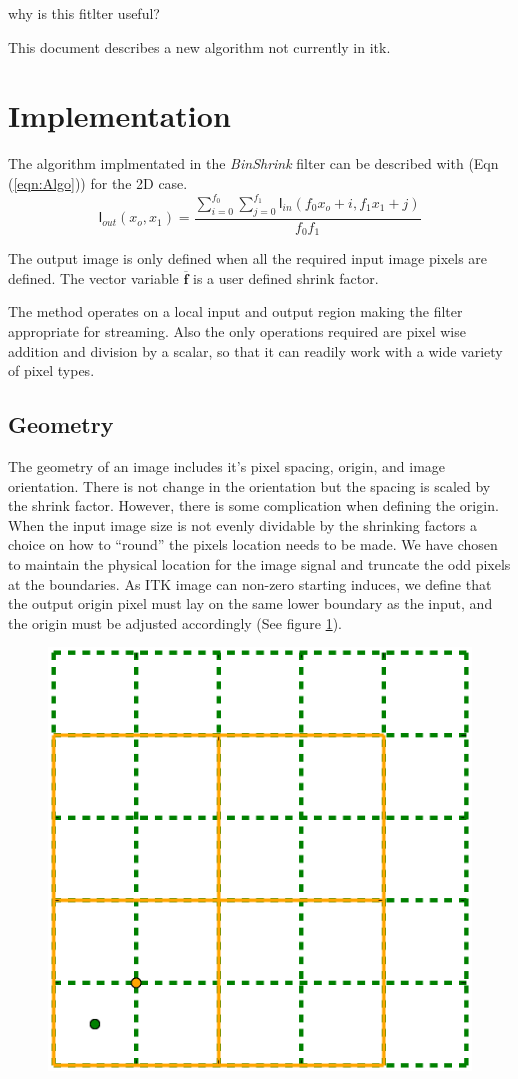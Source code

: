 \documentclass{InsightArticle}
\begin{document}
why is this fitlter useful?


This document describes a new algorithm not currently in
itk\cite{ITKSoftwareGuide}. 

\section{Implementation}

The algorithm implmentated in the \textit{BinShrink} filter can be
described with (Eqn (\ref{eqn:Algo})) for the 2D case. 
\begin{equation}
\label{eqn:Algo}
\mathsf{I}_{out}(x_o,x_1) = \frac{\sum_{i=0}^{f_0}\sum_{j=0}^{f_1}\mathsf{I}_{in}(f_0 x_o+i,f_1 x_1+j)}{f_0 f_1}
\end{equation}

The output image is only defined when all the required input image
pixels are defined. The vector variable $\mathbf{\overline{f}}$ is a user defined
shrink factor.

The method operates on a local input and output region making the
filter appropriate for streaming. Also the only operations required are
pixel wise addition and division by a scalar, so that it can readily
work with a wide variety of pixel types.

\subsection{Geometry}

The geometry of an image includes it's pixel spacing, origin, and
image orientation. There is not change in the orientation but the
spacing is scaled by the shrink factor. However, there is some
complication when defining the origin. When the input image size is
not evenly dividable by the shrinking factors a choice on how to
``round'' the pixels location needs to be made. We have chosen to maintain the physical
location for the image signal and truncate the odd pixels at the
boundaries. As ITK image can non-zero starting induces, we define that
the output origin pixel must lay on the same lower boundary as the
input, and the origin must be adjusted accordingly (See figure \ref{fig:PixelGrid}).

\begin{figure}
  \centering
  \includegraphics[width=0.4\linewidth]{images/pixelgrid}
  \label{fig:PixelGrid}
\end{figure}
\end{document}
